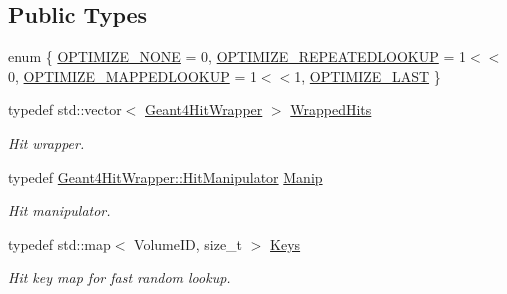 \subsection*{Public Types}
\begin{DoxyCompactItemize}
\item 
enum \{ \hyperlink{class_d_d4hep_1_1_simulation_1_1_geant4_hit_collection_a8fe757ca872800562e5317df0597c844a534e41b5b4b31668654894c119d79f10}{O\+P\+T\+I\+M\+I\+Z\+E\+\_\+\+N\+O\+NE} = 0, 
\hyperlink{class_d_d4hep_1_1_simulation_1_1_geant4_hit_collection_a8fe757ca872800562e5317df0597c844a3831e14471c6e0e7b8b0349696913ea9}{O\+P\+T\+I\+M\+I\+Z\+E\+\_\+\+R\+E\+P\+E\+A\+T\+E\+D\+L\+O\+O\+K\+UP} = 1$<$$<$0, 
\hyperlink{class_d_d4hep_1_1_simulation_1_1_geant4_hit_collection_a8fe757ca872800562e5317df0597c844a762d4b5ef6144a6b8d6b9f5ae9f70450}{O\+P\+T\+I\+M\+I\+Z\+E\+\_\+\+M\+A\+P\+P\+E\+D\+L\+O\+O\+K\+UP} = 1$<$$<$1, 
\hyperlink{class_d_d4hep_1_1_simulation_1_1_geant4_hit_collection_a8fe757ca872800562e5317df0597c844ac14cd6ddf70dd174f944eca4790515b8}{O\+P\+T\+I\+M\+I\+Z\+E\+\_\+\+L\+A\+ST}
 \}
\item 
typedef std\+::vector$<$ \hyperlink{class_d_d4hep_1_1_simulation_1_1_geant4_hit_wrapper}{Geant4\+Hit\+Wrapper} $>$ \hyperlink{class_d_d4hep_1_1_simulation_1_1_geant4_hit_collection_ada2cbec73b2d5005b514a33b44a1dc05}{Wrapped\+Hits}
\begin{DoxyCompactList}\small\item\em Hit wrapper. \end{DoxyCompactList}\item 
typedef \hyperlink{class_d_d4hep_1_1_simulation_1_1_geant4_hit_wrapper_1_1_hit_manipulator}{Geant4\+Hit\+Wrapper\+::\+Hit\+Manipulator} \hyperlink{class_d_d4hep_1_1_simulation_1_1_geant4_hit_collection_a7a4b540fa0c4983ebd755a049a2794b7}{Manip}
\begin{DoxyCompactList}\small\item\em Hit manipulator. \end{DoxyCompactList}\item 
typedef std\+::map$<$ Volume\+ID, size\+\_\+t $>$ \hyperlink{class_d_d4hep_1_1_simulation_1_1_geant4_hit_collection_a0d4d87fb90cf83dceff0b43928426135}{Keys}
\begin{DoxyCompactList}\small\item\em Hit key map for fast random lookup. \end{DoxyCompactList}\end{DoxyCompactItemize}
